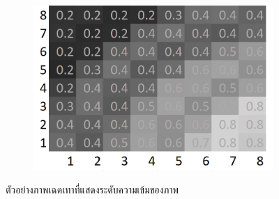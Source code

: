 \begin{figure}[H]
    \centering
    \begin{subfigure}{0.8\linewidth}
        \centering
        \includegraphics[width=0.45\linewidth]{image/grayscale-explain.png}
    \end{subfigure}
    \caption{ตัวอย่างภาพเฉดเทาที่แสดงระดับความเข้มของภาพ}
    \label{figure:grayscale-explain}
\end{figure}